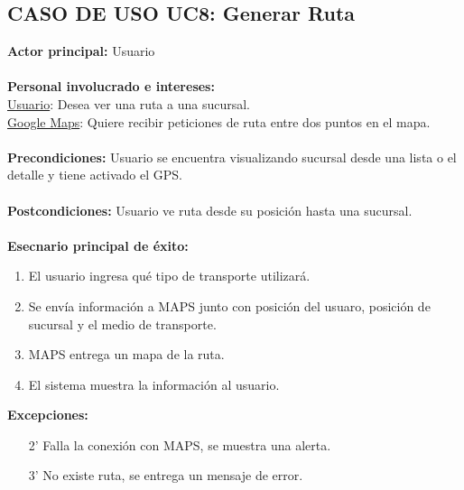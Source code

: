 \documentclass[11pt]{article}
\begin{document}
\subsection*{\textbf{CASO DE USO UC8:} Generar Ruta }
\textbf{Actor principal:} Usuario\\
\\
\textbf{Personal involucrado e intereses:}\\
\underline{Usuario}: Desea ver una ruta a una sucursal.\\
\underline{Google Maps}: Quiere recibir peticiones de ruta entre dos puntos en el mapa.
\\\\
\textbf{Precondiciones:} Usuario se encuentra visualizando sucursal desde una lista o el detalle y tiene activado el GPS.\\
\\
\textbf{Postcondiciones:} Usuario ve ruta desde su posición hasta una sucursal.\\
\\
\textbf{Esecnario principal de éxito:}
\begin{enumerate}
\item El usuario ingresa qué tipo de transporte utilizará.
\item Se envía información a MAPS junto con posición del usuaro, posición de sucursal y el medio de transporte.
\item MAPS entrega un mapa de la ruta.
\item El sistema muestra la información al usuario.
\end{enumerate}
\textbf{Excepciones:}
\begin{enumerate}
\item[2'] Falla la conexión con MAPS, se muestra una alerta.
\item[3'] No existe ruta, se entrega un mensaje de error.
\end{enumerate}
\end{document}
